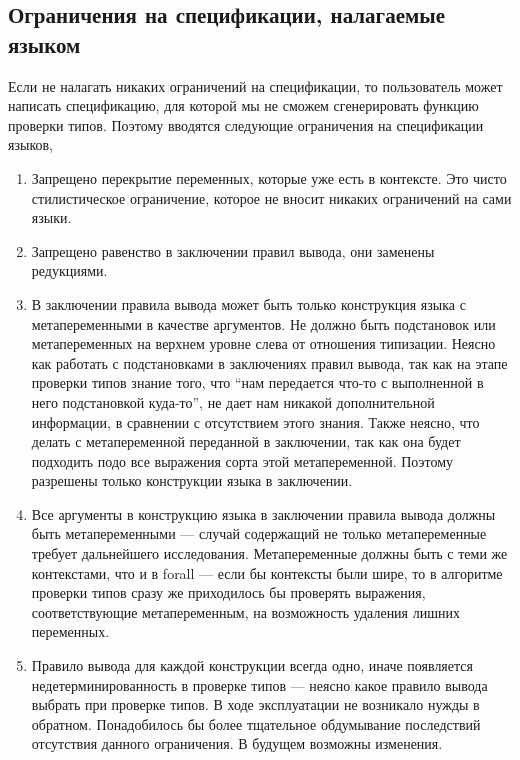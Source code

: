 \subsection{Ограничения на спецификации, налагаемые языком}\label{constraints}

Если не налагать никаких ограничений на спецификации, то пользователь может написать спецификацию, для которой мы не сможем сгенерировать функцию проверки типов. Поэтому вводятся следующие ограничения на спецификации языков,

\begin{enumerate}
\item Запрещено перекрытие переменных, которые уже есть в контексте. Это чисто стилистическое ограничение, которое не вносит никаких ограничений на сами языки.

\item Запрещено равенство в заключении правил вывода, они заменены редукциями.

\item \label{funsym_concl} В заключении правила вывода может быть только конструкция языка с метапеременными в качестве аргументов. Не должно быть подстановок или метапеременных на верхнем уровне слева от отношения типизации. Неясно как работать с подстановками в заключениях правил вывода, так как на этапе проверки типов знание того, что ``нам передается что-то с выполненной в него подстановкой куда-то'', не дает нам никакой дополнительной информации, в сравнении с отсутствием этого знания. Также неясно, что делать с метапеременной переданной в заключении, так как она будет подходить подо все выражения сорта этой метапеременной. Поэтому разрешены только конструкции языка в заключении.

\item Все аргументы в конструкцию языка в заключении правила вывода должны быть метапеременными --- случай содержащий не только метапеременные требует дальнейшего исследования. Метапеременные должны быть с теми же контекстами, что и в forall --- если бы контексты были шире, то в алгоритме проверки типов сразу же приходилось бы проверять выражения, соответствующие метапеременным, на возможность удаления лишних переменных.

\item \label{one_per_fun} Правило вывода для каждой конструкции всегда одно, иначе появляется недетерминированность в проверке типов --- неясно какое правило вывода выбрать при проверке типов. В ходе эксплуатации не возникало нужды в обратном. Понадобилось бы более тщательное обдумывание последствий отсутствия данного ограничения. В будущем возможны изменения.


\end{enumerate}

